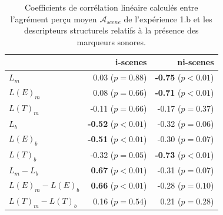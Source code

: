 \documentclass[twoside,twocolumn]{article}
\begin{document}
\begin{table}[t]
\setlength{\tabcolsep}{3pt}
\centering
{\renewcommand{\arraystretch}{1}
\centering
\begin{tabular}{l r r} 
                  &   i-scenes                  & ni-scenes \\
\hline
$L_m$              & 0.03  ($p=0.88$)           & \textbf{-0.75} ($p<0.01$) \\
$L(E)_m$           & 0.08  ($p=0.66$)           & \textbf{-0.71} ($p<0.01$) \\
$L(T)_m$           & -0.11 ($p=0.66$)           & -0.17 ($p=0.37$) \\
$L_b$              & \textbf{-0.52} ($p<0.01$)  & -0.32 ($p=0.06$) \\
$L(E)_b$           & \textbf{-0.51} ($p<0.01$)  & -0.30 ($p=0.07$) \\
$L(T)_b$           & -0.32 ($p=0.05$)           & \textbf{-0.73} ($p<0.01$) \\
$L_m-L_b$          & \textbf{0.67} ($p<0.01$)   & -0.31 ($p=0.07$) \\
$L(E)_m-L(E)_b$    & \textbf{0.66} ($p<0.01$)   & -0.28 ($p=0.10$) \\
$L(T)_m-L(T)_b$    & 0.16 ($p=0.54$)            & 0.21 ($p=0.28$) \\
\hline
\end{tabular}
}
\vspace{0.5mm}
\caption{Coefficients de corrélation linéaire calculés entre l'agrément perçu moyen $\mathcal{A}_{scene}$ de l'expérience 1.b et les descripteurs structurels relatifs à la présence des marqueurs sonores.}
\label{tab:corrMarkers}
\end{table}
\end{document}
